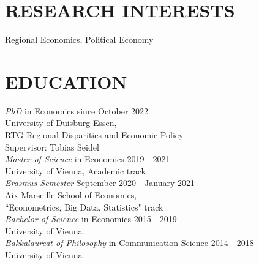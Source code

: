 \documentclass[margin, 12pt]{res} %
\begin{document}
	\begin{resume}
		
		
		\section{RESEARCH INTERESTS}
		Regional Economics, Political Economy
		\hspace{.1cm}
		
		\section{EDUCATION}
		
		{\sl PhD} in Economics \hfill since October 2022 \\
		University of Duisburg-Essen, \\
		RTG Regional Disparities and Economic Policy \\
		Supervisor: Tobias Seidel \vspace{0.2cm}\\
		{\sl Master of Science} in Economics \hfill 2019 - 2021 \\
		University of Vienna, Academic track \vspace{0.2cm}\\
		{\sl Erasmus Semester} \hfill September 2020 - January 2021 \\
		Aix-Marseille School of Economics, \\
		``Econometrics, Big Data, Statistics" track \vspace{0.2cm}\\
		{\sl Bachelor of Science} in Economics \hfill 2015 - 2019 \\
		University of Vienna \vspace{0.2cm}\\ %
		{\sl Bakkalaureat of Philosophy} in Communication Science \hfill 2014 - 2018 \\
		University of Vienna %

		

\end{resume}
\end{document}
